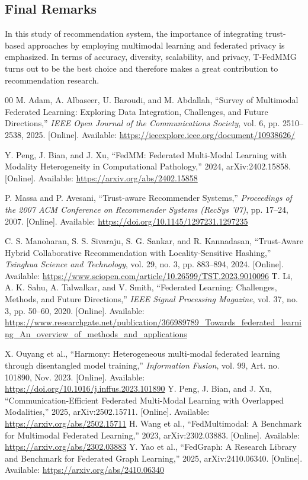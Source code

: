 \documentclass[journal]{IEEEtran} %
\begin{document}
\subsection{Final Remarks}

In this study of recommendation system, the importance of integrating trust-based approaches by employing multimodal learning and federated privacy is emphasized. In terms of accuracy, diversity, scalability, and privacy, T-FedMMG turns out to be the best choice
and therefore makes a great contribution to recommendation research.

\FloatBarrier


\begin{thebibliography}{00}
 M. Adam, A. Albaseer, U. Baroudi, and M. Abdallah, ``Survey of Multimodal Federated Learning: Exploring Data Integration, Challenges, and Future Directions,'' \textit{IEEE Open Journal of the Communications Society}, vol. 6, pp. 2510--2538, 2025. [Online]. Available: \url{https://ieeexplore.ieee.org/document/10938626/}

 Y. Peng, J. Bian, and J. Xu, ``FedMM: Federated Multi-Modal Learning with Modality Heterogeneity in Computational Pathology,'' 2024, arXiv:2402.15858. [Online]. Available: \url{https://arxiv.org/abs/2402.15858}

 P. Massa and P. Avesani, ``Trust-aware Recommender Systems,'' \textit{Proceedings of the 2007 ACM Conference on Recommender Systems (RecSys '07)}, pp. 17--24, 2007. [Online]. Available: \url{https://doi.org/10.1145/1297231.1297235}

 C. S. Manoharan, S. S. Sivaraju, S. G. Sankar, and R. Kannadasan, ``Trust-Aware Hybrid Collaborative Recommendation with Locality-Sensitive Hashing,'' \textit{Tsinghua Science and Technology}, vol. 29, no. 3, pp. 883--894, 2024. [Online]. Available: \url{https://www.sciopen.com/article/10.26599/TST.2023.9010096}
 T. Li, A. K. Sahu, A. Talwalkar, and V. Smith, ``Federated Learning: Challenges, Methods, and Future Directions,'' \textit{IEEE Signal Processing Magazine}, vol. 37, no. 3, pp. 50--60, 2020. [Online]. Available: \url{https://www.researchgate.net/publication/366989789_Towards_federated_learning_An_overview_of_methods_and_applications}

 X. Ouyang et al., ``Harmony: Heterogeneous multi-modal federated learning through disentangled model training,'' \textit{Information Fusion}, vol. 99, Art. no. 101890, Nov. 2023. [Online]. Available: \url{https://doi.org/10.1016/j.inffus.2023.101890}
 Y. Peng, J. Bian, and J. Xu, ``Communication-Efficient Federated Multi-Modal Learning with Overlapped Modalities,'' 2025, arXiv:2502.15711. [Online]. Available: \url{https://arxiv.org/abs/2502.15711}
 H. Wang et al., ``FedMultimodal: A Benchmark for Multimodal Federated Learning,'' 2023, arXiv:2302.03883. [Online]. Available: \url{https://arxiv.org/abs/2302.03883}
 Y. Yao et al., ``FedGraph: A Research Library and Benchmark for Federated Graph Learning,'' 2025, arXiv:2410.06340. [Online]. Available: \url{https://arxiv.org/abs/2410.06340}


\end{thebibliography}
\end{document}
